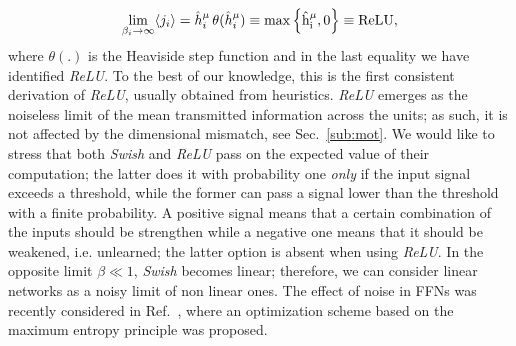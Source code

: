 \documentclass{article}
\begin{document}
%
\begin{equation} \label{eq:ps6}
\lim_{\beta_i \to \infty } \langle j_i \rangle =  \hat{h}^{\mu}_i \, \theta(\hat{h}^{\mu}_i)  \equiv   \rm{max} \left\{ \hat{h}^{\mu}_i, 0\right\} \equiv ReLU,
\end{equation}
%
where $\theta(.)$ is the Heaviside step function and in the last equality we have identified {\it ReLU}. To the best of our knowledge, this is the first consistent derivation of {\it ReLU}, usually obtained from heuristics. {\it ReLU} emerges as the noiseless limit of the mean transmitted information across the units; as such, it is not affected by the dimensional mismatch, see Sec.~\eqref{sub:mot}. We would like to stress that both {\it Swish} and {\it ReLU} pass on the expected value of their computation; the latter does it with probability one {\it only} if the input signal exceeds a threshold, while the former can pass a signal lower than the threshold with a finite probability. A positive signal means that a certain combination of the inputs should be strengthen while a negative one means that it should be weakened, i.e. unlearned; the latter option is absent when using {\it ReLU}. In the opposite limit $\beta \ll 1$, {\it Swish} becomes linear; therefore, we can consider linear networks as a noisy limit of non linear ones. The effect of noise in FFNs was recently considered in Ref.~\cite{pratik}, where an optimization scheme based on the maximum entropy principle was proposed.
%
\end{document}
